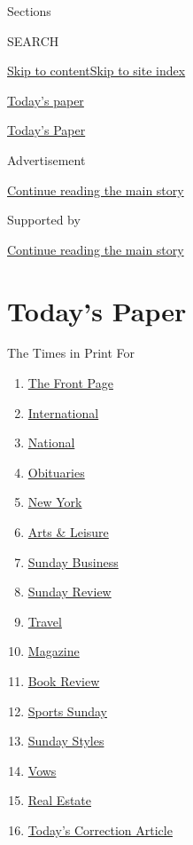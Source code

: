 Sections

SEARCH

\protect\hyperlink{site-content}{Skip to
content}\protect\hyperlink{site-index}{Skip to site index}

\href{https://www.nytimes3xbfgragh.onion/section/todayspaper}{Today's
paper}

\href{https://myaccount.nytimes3xbfgragh.onion/auth/login?response_type=cookie\&client_id=vi}{}

\href{https://www.nytimes3xbfgragh.onion/section/todayspaper}{Today's
Paper}

Advertisement

\protect\hyperlink{after-top}{Continue reading the main story}

Supported by

\protect\hyperlink{after-sponsor}{Continue reading the main story}

\hypertarget{todays-paper}{%
\section{Today's Paper}\label{todays-paper}}

The Times in Print For

\begin{enumerate}
\def\labelenumi{\arabic{enumi}.}
\tightlist
\item
  \protect\hyperlink{thefrontpage}{The Front Page}
\item
  \protect\hyperlink{international}{International}
\item
  \protect\hyperlink{national}{National}
\item
  \protect\hyperlink{obituaries}{Obituaries}
\item
  \protect\hyperlink{newyork}{New York}
\item
  \protect\hyperlink{artsux5cux26leisure}{Arts \& Leisure}
\item
  \protect\hyperlink{sundaybusiness}{Sunday Business}
\item
  \protect\hyperlink{sundayreview}{Sunday Review}
\item
  \protect\hyperlink{travel}{Travel}
\item
  \protect\hyperlink{magazine}{Magazine}
\item
  \protect\hyperlink{bookreview}{Book Review}
\item
  \protect\hyperlink{sportssunday}{Sports Sunday}
\item
  \protect\hyperlink{sundaystyles}{Sunday Styles}
\item
  \protect\hyperlink{vows}{Vows}
\item
  \protect\hyperlink{realestate}{Real Estate}
\item
  \protect\hyperlink{todayux27scorrectionarticle}{Today's Correction
  Article}
\end{enumerate}

